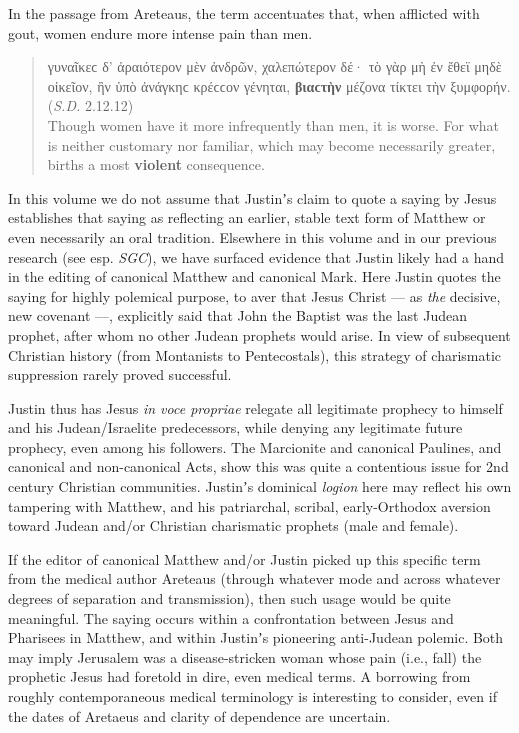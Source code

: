 In the passage from Areteaus, the term accentuates %
that, when afflicted with gout, women endure more intense pain than men. %

\vspace*{3mm}
 \begin{quote}γυναῖκεϲ δ’ ἀραιότερον μὲν ἀνδρῶν, χαλεπώτερον δέ· %
τὸ γὰρ μὴ ἐν ἔθεϊ μηδὲ οἰκεῖον, ἢν ὑπὸ ἀνάγκηϲ κρέϲϲον γένηται, %
\textbf{βιαϲτὴν} μέζονα τίκτει τὴν ξυμφορήν. (\textit{S.D.} 2.12.12)%
\\[1mm] %
 Though women have it more infrequently than men, it is worse. %
 For what is neither customary nor familiar, which may become necessarily greater, %
 births a most \textbf{violent} consequence. \end{quote} %
\vspace*{3mm}

In this volume we do not assume that Justinʼs claim to quote a saying %
by Jesus establishes that saying as reflecting an earlier, stable text form of Matthew %
or even necessarily an oral tradition. %
Elsewhere in this volume and in our previous research (see esp. \textit{SGC}), %
we have surfaced evidence that Justin likely had a hand %
in the editing of canonical Matthew and canonical Mark. %
Here Justin quotes the saying for highly polemical purpose, to aver that Jesus Christ --- %
as \textit{the} decisive, new covenant ---, %
explicitly said that John the Baptist was the last Judean prophet, %
after whom no other Judean prophets would arise. %
In view of subsequent Christian history (from Montanists to Pentecostals), %
this strategy of charismatic suppression rarely proved successful. %

Justin thus has Jesus \textit{in voce propriae} relegate all %
legitimate prophecy to himself and his Judean/Israelite predecessors, %
while denying any legitimate future prophecy, even among his followers. %
The Marcionite and canonical Paulines, and canonical and non-canonical Acts, %
show this was quite a contentious issue for 2nd century Christian communities. %
Justinʼs dominical \textit{logion} here may reflect his own tampering with Matthew, %
and his patriarchal, scribal, early-Orthodox aversion toward %
Judean and/or Christian charismatic prophets (male and female). %

If the editor of canonical Matthew and/or Justin picked up this specific term %
from the medical author Areteaus %
(through whatever mode and across whatever degrees of separation and transmission), %
then such usage would be quite meaningful. %
The saying occurs within a confrontation between Jesus and Pharisees in Matthew, %
and within Justinʼs pioneering anti-Judean polemic. %
Both may imply Jerusalem was a disease-stricken woman whose pain (i.e., fall) %
the prophetic Jesus had foretold in dire, even medical terms. %
A borrowing from roughly contemporaneous medical terminology is interesting to consider, %
even if the dates of Aretaeus and clarity of dependence are uncertain. \\[1.5mm] %

